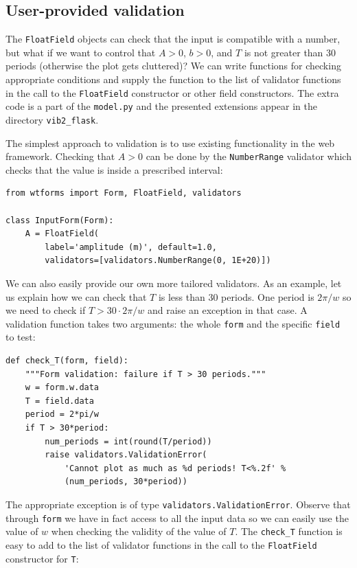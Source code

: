 \documentclass[%
oneside,                 %
final,                   %
10pt]{article}
\begin{document}
\subsection{User-provided validation}





The \Verb!FloatField! objects can check that the input is compatible with
a number, but what if we want to control that $A>0$, $b>0$, and
$T$ is not greater than 30 periods (otherwise the plot gets cluttered)?
We can write functions for checking appropriate conditions and
supply the function to the list of validator functions in the call to
the \Verb!FloatField! constructor or other field constructors. The extra
code is a part of the \Verb!model.py! and the presented extensions appear
in the directory \Verb!vib2_flask!.

The simplest approach to validation is to use existing functionality
in the web framework. Checking that $A>0$ can be done by
the \Verb!NumberRange! validator which checks that the value is inside
a prescribed interval:

\begin{Verbatim}[numbers=none,fontsize=\fontsize{9pt}{9pt},baselinestretch=0.85]
from wtforms import Form, FloatField, validators

class InputForm(Form):
    A = FloatField(
        label='amplitude (m)', default=1.0,
        validators=[validators.NumberRange(0, 1E+20)])
\end{Verbatim}

We can also easily provide our own more tailored validators.
As an example, let us explain how we can check that $T$ is less than 30 periods.
One period is $2\pi /w$ so we need to check if $T> 30\cdot 2\pi/w$
and raise an exception in that case.
A validation function takes two arguments: the whole \Verb!form! and the
specific \Verb!field! to test:

\begin{Verbatim}[numbers=none,fontsize=\fontsize{9pt}{9pt},baselinestretch=0.85]
def check_T(form, field):
    """Form validation: failure if T > 30 periods."""
    w = form.w.data
    T = field.data
    period = 2*pi/w
    if T > 30*period:
        num_periods = int(round(T/period))
        raise validators.ValidationError(
            'Cannot plot as much as %d periods! T<%.2f' %
            (num_periods, 30*period))
\end{Verbatim}
The appropriate exception is of type \Verb!validators.ValidationError!.
Observe that through \Verb!form! we have in fact access to all the input
data so we can easily use the value of $w$ when checking the validity
of the value of $T$. The \Verb!check_T! function is easy to
add to the list of validator functions in the call to the \Verb!FloatField!
constructor for \Verb!T!:
\end{document}
